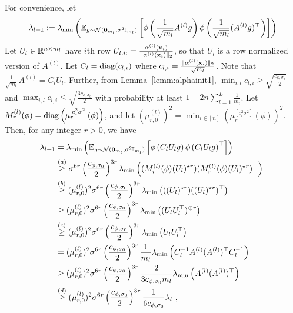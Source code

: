  For convenience, let
\begin{align*}
\lambda_{l+1} := \lambda_{\min}\left(  \mathbb{E}_{g \sim 
{\cal N}(\bm{0}_{m_{l}},\sigma^2 \mathbb{I}_{m_{l}})
}\left[ \phi\left( \frac{1}{\sqrt{m_{l}}} A^{(l)} g \right) \phi\left( \frac{1}{\sqrt{m_{l}}} (A^{(l)} g)^\top\right) \right] \right)
\end{align*}
Let $U_l \in \mathbb{R}^{n \times m_l}$ have $i$th row $U_{l,i:} = \frac{\alpha^{(l)}(\mathbf{x}_i)}{\|\alpha^{(l)}(\mathbf{x}_i)\|_2}$, so that $U_l$ is a row normalized version of $A^{(l)}$. Let $C_l = \operatorname{diag}(c_{l,i})$ where $c_{l,i} = \frac{\|\alpha^{(l)}(\mathbf{x}_i)\|_2}{\sqrt{m_l}}$. Note that $\frac{1}{\sqrt{m_l}} A^{(l)} = C_l U_l$. Further, from Lemma~\ref{lemm:alphainit1}, $\min_{i,l} c_{l,i} \geq \sqrt{\frac{c_{\phi,\sigma_0}}{2}}$ and $\max_{i,l} c_{l,i} \leq \sqrt{\frac{3c_{\phi,\sigma_0}}{2}}$ with probability at least $1 - 2n\sum^L_{l=1}\frac{1}{m_l}$.
Let $M^{(l)}_r(\phi) = \operatorname{diag}\left( \mu_r^{[c_i^2 \sigma^2]}(\phi) \right)$, and let $(\mu_{r,0}^{(l)})^2 = \min_{i \in [n]} \left( \mu_r^{[c_i^2 \sigma^2]}(\phi) \right)^2$.
Then, for any integer $r > 0$, we have 
\begin{align*}
\lambda_{l+1} & = \lambda_{\min} \left( \mathbb{E}_{g \sim 
{\cal N}(\bm{0}_{m_{l}},\sigma^2 \mathbb{I}_{m_{l}})
}\left[ \phi\left( C_l U_l g\right) \phi\left( C_l U_l g\right)^\top \right] \right) \\
& \overset{(a)}{\geq} \sigma^{6r} \left( \frac{c_{\phi,\sigma_0}}{2} \right)^{3r} \lambda_{\min} \left( (M_r^{(l)}(\phi) (U_l)^{\star r}) (M_r^{(l)}(\phi) (U_l)^{\star r})^\top \right)~\\ 
& \overset{(b)}{\geq} (\mu_{r,0}^{(l)})^2 \sigma^{6r} \left( \frac{c_{\phi,\sigma_0}}{2} \right)^{3r} \lambda_{\min} \left( ((U_l)^{\star r}) ((U_l)^{\star r})^\top \right)~\\ 
& \geq (\mu_{r,0}^{(l)})^2 \sigma^{6r} \left( \frac{c_{\phi,\sigma_0}}{2} \right)^{3r} \lambda_{\min} \left(( U_l U_l^\top)^{\odot r} \right)~\\ 
& \overset{(c)}{\geq} (\mu_{r,0}^{(l)})^2 \sigma^{6r} \left( \frac{c_{\phi,\sigma_0}}{2} \right)^{3r} \lambda_{\min} \left( U_l U_l^\top \right) \\
& = (\mu_{r,0}^{(l)})^2 \sigma^{6r} \left( \frac{c_{\phi,\sigma_0}}{2} \right)^{3r} \frac{1}{m_l}  \lambda_{\min} \left( C_l^{-1} A^{(l)} (A^{(l)})^\top C_l^{-1} \right) \\
& \geq (\mu_{r,0}^{(l)})^2 \sigma^{6r} \left( \frac{c_{\phi,\sigma_0}}{2} \right)^{3r} \frac{2}{3 c_{\phi,\sigma_0}m_l} \lambda_{\min}  \left( A^{(l)} (A^{(l)})^\top \right) \\
& \overset{(d)}{\geq} (\mu_{r,0}^{(l)})^2 \sigma^{6r} \left( \frac{c_{\phi,\sigma_0}}{2} \right)^{3r} \frac{1}{6 c_{\phi,\sigma_0}} \lambda_l~,
\end{align*}
